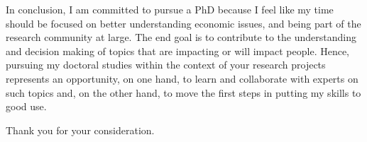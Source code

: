 \documentclass{letter}
\begin{document}
\begin{letter}{}
    In conclusion, I am committed to pursue a PhD because I feel like my time should be focused on better understanding economic issues, and being part of the research community at large. The end goal is to contribute to the understanding and decision making of topics that are impacting or will impact people. Hence, pursuing my doctoral studies within the context of your research projects represents an opportunity, on one hand, to learn and collaborate with experts on such topics and, on the other hand, to move the first steps in putting my skills to good use.

    \closing{Thank you for your consideration.}

\end{letter}
\end{document}
